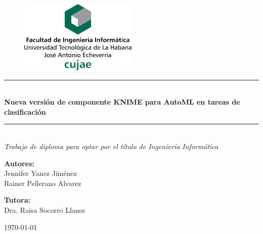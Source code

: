 \begin{figure}
	\centering
	\includegraphics[width=0.5\textwidth]{figuras/membrete-cujae-centrado.png}
\end{figure}
	\begin{center}
	\newcommand{\HRule}{\rule{\linewidth}{0.8mm}}
	
	\vspace*{0.5cm}
	
	\HRule \\[0.4cm]

	\LARGE{\textbf{Nueva versión de componente KNIME para AutoML en tareas de clasificación}}

	\HRule \\[1.5cm]
	
    \textit{\large{Trabajo de diploma para optar por el título de Ingeniería Informática}}

	\vspace{1.5cm}
	
	\large{
	\textbf{Autores:} \\
	Jennifer Yanez Jiménez\\
	Rainer Pellerano Alvarez\\
	\vspace{1.5cm}
	
	\textbf{Tutora:}\\
	Dra. Raisa Socorro Llanes\\
	}
	
	\vspace{2cm}
	
	{\mifecha\today}
	
\end{center}	


